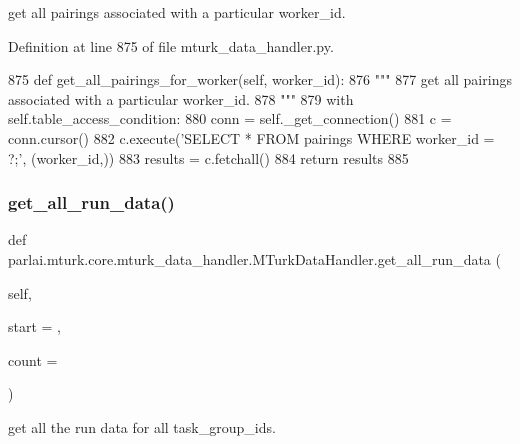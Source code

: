 \begin{DoxyVerb}get all pairings associated with a particular worker_id.
\end{DoxyVerb}
 

Definition at line 875 of file mturk\+\_\+data\+\_\+handler.\+py.


\begin{DoxyCode}
875     \textcolor{keyword}{def }get\_all\_pairings\_for\_worker(self, worker\_id):
876         \textcolor{stringliteral}{"""}
877 \textcolor{stringliteral}{        get all pairings associated with a particular worker\_id.}
878 \textcolor{stringliteral}{        """}
879         with self.table\_access\_condition:
880             conn = self.\_get\_connection()
881             c = conn.cursor()
882             c.execute(\textcolor{stringliteral}{'SELECT * FROM pairings WHERE worker\_id = ?;'}, (worker\_id,))
883             results = c.fetchall()
884             \textcolor{keywordflow}{return} results
885 
\end{DoxyCode}
\mbox{\label{classparlai_1_1mturk_1_1core_1_1mturk__data__handler_1_1MTurkDataHandler_a260b4003fe27797a7e49547db992d06e}} 
\subsubsection{\texorpdfstring{get\+\_\+all\+\_\+run\+\_\+data()}{get\_all\_run\_data()}}
{\footnotesize\ttfamily def parlai.\+mturk.\+core.\+mturk\+\_\+data\+\_\+handler.\+M\+Turk\+Data\+Handler.\+get\+\_\+all\+\_\+run\+\_\+data (\begin{DoxyParamCaption}\item[{}]{self,  }\item[{}]{start = {},  }\item[{}]{count = {} }\end{DoxyParamCaption})}

\begin{DoxyVerb}get all the run data for all task_group_ids.
\end{DoxyVerb}
 

